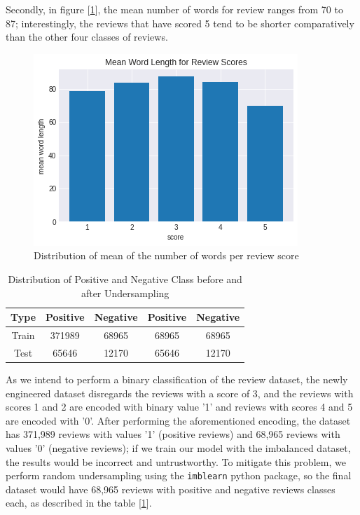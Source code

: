 \documentclass[11pt]{article}
\begin{document}
 Secondly, in figure [\ref{fig:review_score_wordlength}], the mean number of words for review ranges from 70 to 87; interestingly, the reviews that have scored 5 tend to be shorter comparatively than the other four classes of reviews.
 \begin{figure}
     \centering
     \includegraphics[scale=0.5]{figures/mean_wordlength_distribution.png}
     \caption{Distribution of mean of the number of words per review score}
     \label{fig:review_score_wordlength}
 \end{figure}
  \begin{table}[h!]
 \small
     \centering
     \begin{tabular}{c| c c | c c}
     \hline 
        Type & Positive & Negative &Positive &Negative\\ \hline 
         Train &  371989 &68965 &68965 & 68965\\
          Test & 65646 &12170 & 65646 &12170\\ \hline 
     \end{tabular}
     \caption{Distribution of Positive and Negative Class before and after Undersampling}
     \label{tab:class_distri}
 \end{table}
 As we intend to perform a binary classification of the review dataset, the newly engineered dataset disregards the reviews with a score of 3, and the reviews with scores 1 and 2 are encoded with binary value '1' and reviews with scores 4 and 5 are encoded with '0'. After performing the aforementioned encoding, the dataset has 371,989 reviews with values '1' (positive reviews) and 68,965 reviews with values '0' (negative reviews); if we train our model with the imbalanced dataset, the results would be incorrect and untrustworthy. To mitigate this problem, we perform random undersampling using the \texttt{imblearn} python package, so the final dataset would have 68,965 reviews with positive and negative reviews classes each, as described in the table [\ref{tab:class_distri}].
\end{document}
